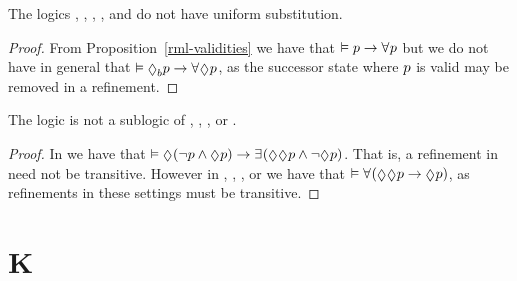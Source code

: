 \begin{proposition}
The logics \logicRmlK{}, \logicRmlKF{}, \logicRmlKFF{}, \logicRmlKD{}, \logicRmlSF{} and \logicRmlS{} do not have uniform substitution.
\end{proposition}

\begin{proof}
From Proposition~\ref{rml-validities} we have that $\entails \atomP \implies \allrefs \atomP$ but we do not have in general that $\entails \possibleB \atomP \implies \allrefs \possible \atomP$, as the successor state where $p$ is valid may be removed in a refinement.
\end{proof}

\begin{proposition}
The logic \logicRmlK{} is not a sublogic of \logicRmlKF{}, \logicRmlKFF{}, \logicRmlKD{}, \logicRmlSF{} or \logicRmlS{}.
\end{proposition}

\begin{proof}
In \logicRmlK{} we have that $\entails \possible (\lnot \atomP \land \possible \atomP) \implies \somerefs (\possible \possible \atomP \land \lnot \possible \atomP)$. 
That is, a refinement in \logicRmlK{} need not be transitive.
However in \logicRmlKF{}, \logicRmlKFF{}, \logicRmlKD{}, \logicRmlSF{} or \logicRmlS{} we have that $\entails \allrefs (\possible \possible \atomP \implies \possible \atomP)$, as refinements in these settings must be transitive.
\end{proof}

\section{K}

